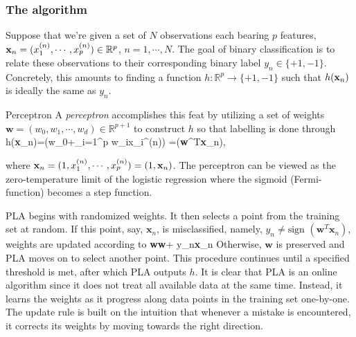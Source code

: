 \subsubsection{The algorithm}


Suppose that we're given a set of $N$ observations each bearing $p$ features, $\mathbf{x}_n=(x_1^{(n)},\cdots, x_p^{(n)})\in\mathbb{R}^p$, $n=1,\cdots, N$. The goal of binary classification is to relate these observations to their corresponding binary label $y_n \in\{+1,-1\}$. Concretely, this amounts to finding a function $h: \mathbb{R}^p\rightarrow \{+1,-1\}$ such that $h(\mathbf{x}_n)$ is ideally the same as $y_n$. 
\begin{mybox}{Perceptron} 
	A \emph{perceptron} accomplishes this feat by utilizing a set of weights $\textbf{w}=(w_0,w_1,\cdots, w_d)\in\mathbb{R}^{p+1}$ to construct $h$ so that labelling is done through
\be 
	h(\textbf{x}_n)=\left(w_0+\sum_{i=1}^p w_ix_i^{(n)}\right) =(\textbf{w}^T\textbf{x}_n),
	\ee 
	
	where $\textbf{x}_n=(1,x_1^{(n)},\cdots, x_p^{(n)}) = (1,\mathbf{x}_n)$. The perceptron can be viewed as the zero-temperature limit of the logistic regression where the sigmoid (Fermi-function) becomes a step function.
	
\end{mybox}

PLA begins with randomized weights. It then selects a point from the training set at random. If this point, say, $\textbf{x}_n$, is misclassified, namely, $y_n\neq \text{sign }(\textbf{w}^T\textbf{x}_n)$, weights are updated according to 
\be 
\textbf{w}\leftarrow \textbf{w}+ y_n\textbf{x}_n
\ee 
Otherwise, $\textbf{w}$ is preserved and PLA moves on to select another point. This procedure continues until a specified threshold is met, after which PLA outputs $h$. It is clear that PLA is an online algorithm since it does not treat all available data at the same time. Instead, it learns the weights as it progress along data points in the training set one-by-one. The update rule is built on the intuition that whenever a mistake is encountered, it corrects its weights by moving towards the right direction. 












